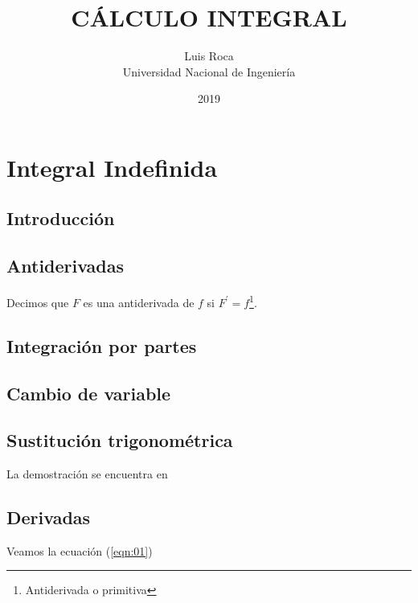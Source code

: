 \documentclass[11pt,a4paper]{book}
\title{CÁLCULO INTEGRAL}
\author{Luis Roca \\ 
Universidad Nacional de Ingeniería}
\date{2019}
\begin{document}
\frontmatter
\maketitle
\tableofcontents
\mainmatter
\chapter{Integral Indefinida}
\section*{Introducción}
\section{Antiderivadas}
Decimos que $F$ es una antiderivada de $f$ si $F^\prime=f$\footnote{Antiderivada o primitiva}.

\section{Integración por partes}
\section{Cambio de variable}
\section{Sustitución trigonométrica}
La demostración se encuentra en \cite{GANGULY1997315}
\section{Derivadas}

Veamos la ecuación (\ref{eqn:01})
\printbibliography
\end{document}
